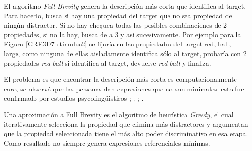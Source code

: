 
El algoritmo {\it Full Brevity} \cite{Dale:1989:CUR:981623.981632} genera la descripci\'on m\'as corta que identifica al target. Para hacerlo, 
busca si hay una propiedad del target que no sea propiedad de ning\'un distractor. Si no hay chequea todas las posibles combinaciones de 2 propiedades, si no la hay, busca de a 3 y as\'i sucesivamente. Por ejemplo para la Figura \ref{GRE3D7-stimulus2} se fijar\'ia en las propiedades del target {red, ball, large}, como ninguna de ellas aisladamente identifica s\'olo al target, probar\'ia con 2 propiedades {\it red ball} si identifica al target, devuelve {\it red ball} y finaliza.

El problema es que encontrar la descripci\'on m\'as corta es computacionalmente caro, se observ\'o que las personas dan expresiones que no son minimales, esto fue confirmado por estudios psycoling\"uisticos \cite{Olson1970LangAndThought};  \cite{Sonnenschein1984}; \cite{Pechmann1989}; \cite{Engelhardt2006}.

Una aproximaci\'on a Full Brevity es el algoritmo de heur\'istica {\it Greedy}, el cual iterativamente selecciona la propiedad que elimina m\'as distractores y argumentan que la propiedad seleccionada tiene el m\'as alto poder discriminativo en esa etapa. Como resultado no siempre genera expresiones referenciales m\'inimas.

